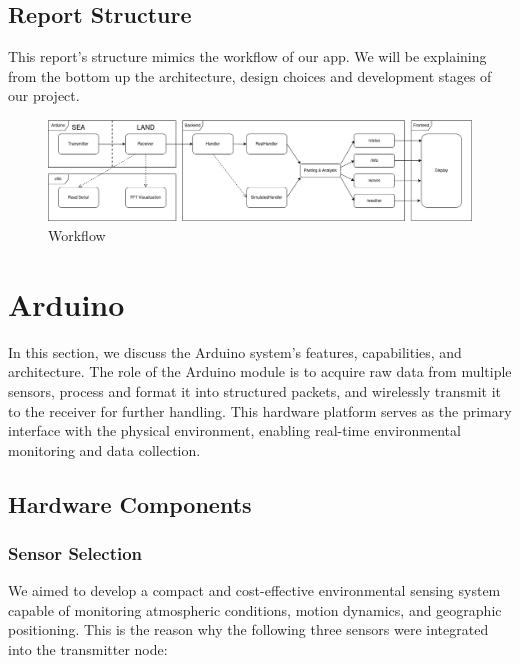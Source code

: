 \documentclass{article}
\begin{document}
    \subsection{Report Structure}
    This report's structure mimics the workflow of our app. We will be explaining from the bottom up the architecture, design choices and development stages of our project.

    \begin{figure} [h]
        \centering
        \includegraphics[width=1\linewidth]{assets/workflow.png}
        \caption{Workflow}
        \label{fig:enter-label}
    \end{figure}

\newpage
\section{Arduino}
In this section, we discuss the Arduino system’s features, capabilities, and architecture. The role of the Arduino module is to acquire raw data from multiple sensors, process and format it into structured packets, and wirelessly transmit it to the receiver for further handling. This hardware platform serves as the primary interface with the physical environment, enabling real-time environmental monitoring and data collection.
\subsection{Hardware Components}
    \subsubsection{Sensor Selection}
    We aimed to develop a compact and cost-effective environmental sensing system capable of monitoring atmospheric conditions, motion dynamics, and geographic positioning. This is the reason why the following three sensors were integrated into the transmitter node:
    
\end{document}

